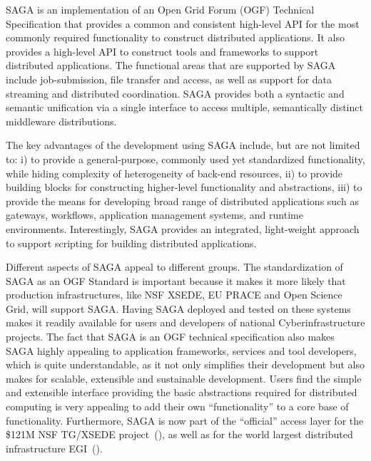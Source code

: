 \documentclass{sig-alternate}
\begin{document}
SAGA is an implementation of an Open Grid Forum (OGF) Technical Specification
that provides a common and consistent high-level API for the most
commonly required functionality to construct distributed applications.
It also provides a high-level API to construct tools and frameworks to
support distributed applications. The functional areas that are
supported by SAGA include job-submission, file transfer and access, as
well as support for data streaming and distributed coordination. SAGA
provides both a syntactic and semantic unification via a single
interface to access multiple, semantically distinct middleware
distributions.


The key advantages of the development using SAGA include, but are not
limited to: i) to provide a general-purpose, commonly used yet
standardized functionality, while hiding complexity of heterogeneity
of back-end resources, ii) to provide building blocks for constructing
higher-level functionality and abstractions, iii) to provide the means
for developing broad range of distributed applications such as
gateways, workflows, application management systems, and runtime
environments. Interestingly, SAGA provides an integrated, light-weight
approach to support scripting for building distributed applications.

Different aspects of SAGA appeal to different groups. The
standardization of SAGA as an OGF Standard is important because it
makes it more likely that production infrastructures, like NSF XSEDE,
EU PRACE and Open Science Grid, will support SAGA. Having SAGA
deployed and tested on these systems makes it readily available for
users and developers of national Cyberinfrastructure projects. The
fact that SAGA is an OGF technical specification also makes SAGA
highly appealing to application frameworks, services and tool
developers, which is quite understandable, as it not only simplifies
their development but also makes for scalable, extensible and
sustainable development. Users find the simple and extensible
interface providing the basic abstractions required for distributed
computing is very appealing to add their own ``functionality'' to a
core base of functionality. Furthermore, SAGA is now part of the
``official'' access layer for the \$121M NSF TG/XSEDE
project~(\cite{xsede_url}), as well as for the world largest distributed
infrastructure EGI~(\cite{egi_url}).
\end{document}
